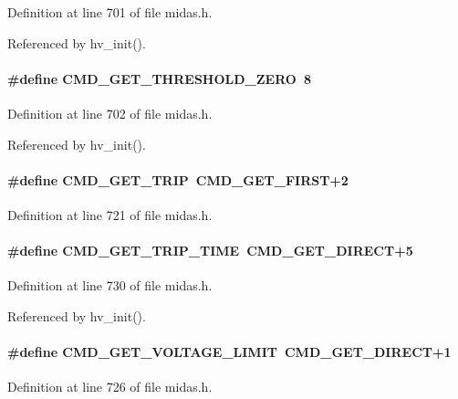 Definition at line 701 of file midas.h.

Referenced by hv\_\-init().
\paragraph[{CMD\_\-GET\_\-THRESHOLD\_\-ZERO}]{\setlength{\rightskip}{0pt plus 5cm}\#define CMD\_\-GET\_\-THRESHOLD\_\-ZERO~8}\hfill\label{group__err26_gaea8b0116d495be466ccec4983e057c80}


Definition at line 702 of file midas.h.

Referenced by hv\_\-init().
\paragraph[{CMD\_\-GET\_\-TRIP}]{\setlength{\rightskip}{0pt plus 5cm}\#define CMD\_\-GET\_\-TRIP~CMD\_\-GET\_\-FIRST+2}\hfill\label{group__err26_ga2e57877b743e39cd5f3f54eacb9d924b}


Definition at line 721 of file midas.h.
\paragraph[{CMD\_\-GET\_\-TRIP\_\-TIME}]{\setlength{\rightskip}{0pt plus 5cm}\#define CMD\_\-GET\_\-TRIP\_\-TIME~CMD\_\-GET\_\-DIRECT+5}\hfill\label{group__err26_ga6556f17b00a7c75ce492cf0664fcad15}


Definition at line 730 of file midas.h.

Referenced by hv\_\-init().
\paragraph[{CMD\_\-GET\_\-VOLTAGE\_\-LIMIT}]{\setlength{\rightskip}{0pt plus 5cm}\#define CMD\_\-GET\_\-VOLTAGE\_\-LIMIT~CMD\_\-GET\_\-DIRECT+1}\hfill\label{group__err26_ga7202bbec592221c9cb28fbf4e7f4a65e}


Definition at line 726 of file midas.h.

